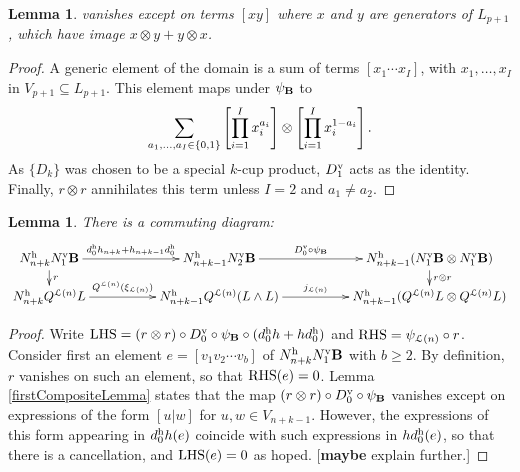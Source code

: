\documentclass[11pt]{amsart}
\theoremstyle{plain}
\newtheorem{lem}[thm]{Lemma}
\theoremstyle{definition}
\newcommand{\calL}{\mathcal{L}}
\theoremstyle{plain}
\begin{document}
\begin{appendices}
\begin{lem}
vanishes except on terms $[xy]$ where $x$ and $y$ are generators of $ L_{p+1}$, which have image $x\otimes y+y\otimes x$.
\end{lem}
\begin{proof}
A generic element of the domain is a sum of terms $[x_1\cdots x_I]$, with $x_1,\ldots,x_I$ in $V_{p+1}\subseteq L_{p+1}$. This element maps under $\psi_{\textup{\textbf{B}}}$ to
\[\sum_{\smash{a_1,\ldots,a_I\in\{0,1\}}}
\left[\prod_{i=1}^Ix_i^{a_i}\right]\otimes
\left[\prod_{i=1}^Ix_i^{1-a_i}\right].\]
As $\{D_k\}$ was chosen to be a special $k$-cup product, $D_1^\textup{v}$ acts as the identity.
Finally, $r\otimes r$ annihilates this term unless $I=2$ and $a_1\neq a_2$.
\end{proof}
\begin{lem}\label{commuting rectangle lemma for lie operations}
There is a commuting diagram:
\[\xymatrix@R=4mm@C=18mm{
N_{n+k}^\textup{h}N_1^\textup{v}\textup{\textbf{B}} \ar[r]^-{d^\textup{h}_0h_{n+k}+h_{n+k-1}d^\textup{h}_0}
\ar[d]^-{r}&%
N_{n+k-1}^\textup{h}N_2^\textup{v}\textup{\textbf{B}} \ar[r]^-{D^\textup{v}_0\circ\psi_{\textup{\textbf{B}}}}&%
N_{n+k-1}^\textup{h}(N_1^\textup{v}\textup{\textbf{B}}\otimes N_1^\textup{v}\textup{\textbf{B}})\ar[d]^-{r\otimes r}
\\%
N_{n+k}^\textup{h}Q^{\calL(n)} L  \ar[r]^-{Q^{\calL(n)}(\xi_{\calL(n)})}&%
N_{n+k-1}^\textup{h}Q^{\calL(n)}( L\wedge  L) \ar[r]^-{j_{\calL(n)}}&%
N_{n+k-1}^\textup{h}(Q^{\calL(n)} L \otimes Q^{\calL(n)} L )
}\]
\end{lem}
\begin{proof}
Write
$\textup{LHS}=(r\otimes r)\circ D^\textup{v}_0\circ\psi_{\textup{\textbf{B}}}\circ(d_0^\textup{h}h+hd^\textup{h}_0)$ and $\textup{RHS}= \psi_{\calL(n)}\circ r$.
Consider first an element $e=[v_1v_2\cdots v_b]$ of $N_{n+k}^\textup{h}N_1^\textup{v}\textbf{B}$ with $b\geq2$. By definition, $r$ vanishes on such an element, so that $\textup{RHS}(e)=0$. Lemma \ref{firstCompositeLemma} states that the map $(r\otimes r)\circ D^\textup{v}_0\circ\psi_{\textup{\textbf{B}}}$ vanishes except on expressions of the form $[u|w]$ for $u,w\in V_{n+k-1}$. However, the expressions of this form appearing in $d^\textup{h}_0h(e)$ coincide with such expressions in $hd^\textup{h}_0(e)$, so that there is a cancellation, and $\textup{LHS}(e)=0$ as hoped. [\textbf{maybe} explain further.]


\end{proof}
\end{appendices}
\end{document}
